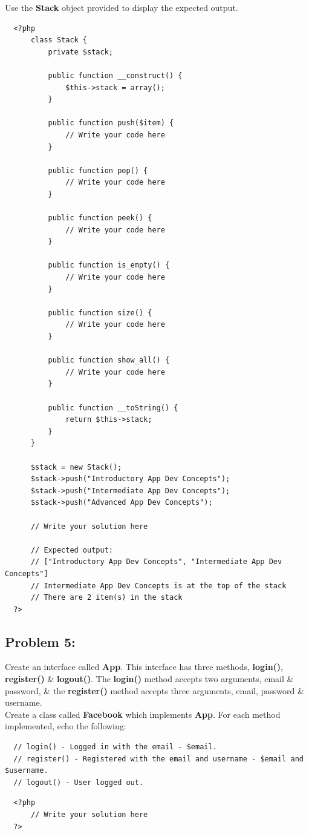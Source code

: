 \documentclass{article}
\begin{document}
Use the \textbf{Stack} object provided to display the expected output. 

\begin{verbatim}
  <?php
      class Stack {
          private $stack;

          public function __construct() {
              $this->stack = array();
          }

          public function push($item) {
              // Write your code here
          }

          public function pop() {
              // Write your code here
          }

          public function peek() {
              // Write your code here
          }

          public function is_empty() {
              // Write your code here
          }

          public function size() {
              // Write your code here
          }

          public function show_all() {
              // Write your code here
          }

          public function __toString() {
              return $this->stack;
          }
      }   
          
      $stack = new Stack();
      $stack->push("Introductory App Dev Concepts");
      $stack->push("Intermediate App Dev Concepts");
      $stack->push("Advanced App Dev Concepts");

      // Write your solution here

      // Expected output:
      // ["Introductory App Dev Concepts", "Intermediate App Dev Concepts"]
      // Intermediate App Dev Concepts is at the top of the stack
      // There are 2 item(s) in the stack
  ?>
\end{verbatim}

\subsection*{Problem 5:} 
Create an interface called \textbf{App}. This interface has three methods, \textbf{login()}, \textbf{register()} \& \textbf{logout()}. The \textbf{login()} method accepts two arguments, email \& password, \& the \textbf{register()} method accepts three arguments, email, password \& username. \\

Create a class called \textbf{Facebook} which implements \textbf{App}. For each method implemented, echo the following:
\begin{verbatim}
  // login() - Logged in with the email - $email.
  // register() - Registered with the email and username - $email and $username.
  // logout() - User logged out.
\end{verbatim}

\begin{verbatim}
  <?php
      // Write your solution here
  ?>
\end{verbatim}
\end{document}
